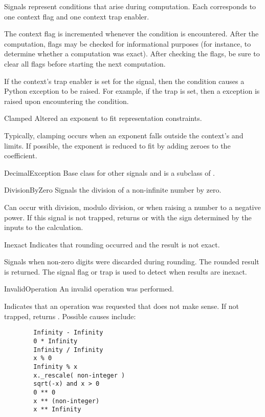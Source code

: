 Signals represent conditions that arise during computation.
Each corresponds to one context flag and one context trap enabler.

The context flag is incremented whenever the condition is encountered.
After the computation, flags may be checked for informational
purposes (for instance, to determine whether a computation was exact).
After checking the flags, be sure to clear all flags before starting
the next computation.

If the context's trap enabler is set for the signal, then the condition
causes a Python exception to be raised.  For example, if the
 trap is set, then a 
exception is raised upon encountering the condition.


\begin{classdesc*}{Clamped}
    Altered an exponent to fit representation constraints.

    Typically, clamping occurs when an exponent falls outside the context's
     and  limits.  If possible, the exponent is
    reduced to fit by adding zeroes to the coefficient.
\end{classdesc*}

\begin{classdesc*}{DecimalException}
    Base class for other signals and is a subclass of
    .
\end{classdesc*}

\begin{classdesc*}{DivisionByZero}
    Signals the division of a non-infinite number by zero.

    Can occur with division, modulo division, or when raising a number to a
    negative power.  If this signal is not trapped, returns
     or  with the sign determined by
    the inputs to the calculation.
\end{classdesc*}

\begin{classdesc*}{Inexact}
    Indicates that rounding occurred and the result is not exact.

    Signals when non-zero digits were discarded during rounding. The rounded
    result is returned.  The signal flag or trap is used to detect when
    results are inexact.
\end{classdesc*}

\begin{classdesc*}{InvalidOperation}
    An invalid operation was performed.

    Indicates that an operation was requested that does not make sense.
    If not trapped, returns .  Possible causes include:

    \begin{verbatim}
        Infinity - Infinity
        0 * Infinity
        Infinity / Infinity
        x % 0
        Infinity % x
        x._rescale( non-integer )
        sqrt(-x) and x > 0
        0 ** 0
        x ** (non-integer)
        x ** Infinity      
    \end{verbatim}    
\end{classdesc*}


